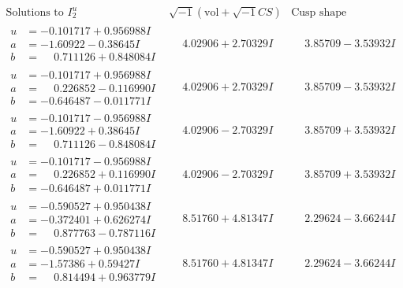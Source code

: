 \documentclass[1p]{elsarticle_modified}
\theoremstyle{definition}
\newcommand{\I}{\sqrt{-1}}
\begin{document}
$$\begin{array}{c|c|c}  
\text{Solutions to }I^u_{2}& \I (\text{vol} + \sqrt{-1}CS) & \text{Cusp shape}\\
 \hline 
\begin{aligned}
u &= -0.101717 + 0.956988 I \\
a &= -1.60922 - 0.38645 I \\
b &= \phantom{-}0.711126 + 0.848084 I\end{aligned}
 & \phantom{-}4.02906 + 2.70329 I & \phantom{-}3.85709 - 3.53932 I \\ \hline\begin{aligned}
u &= -0.101717 + 0.956988 I \\
a &= \phantom{-}0.226852 - 0.116990 I \\
b &= -0.646487 - 0.011771 I\end{aligned}
 & \phantom{-}4.02906 + 2.70329 I & \phantom{-}3.85709 - 3.53932 I \\ \hline\begin{aligned}
u &= -0.101717 - 0.956988 I \\
a &= -1.60922 + 0.38645 I \\
b &= \phantom{-}0.711126 - 0.848084 I\end{aligned}
 & \phantom{-}4.02906 - 2.70329 I & \phantom{-}3.85709 + 3.53932 I \\ \hline\begin{aligned}
u &= -0.101717 - 0.956988 I \\
a &= \phantom{-}0.226852 + 0.116990 I \\
b &= -0.646487 + 0.011771 I\end{aligned}
 & \phantom{-}4.02906 - 2.70329 I & \phantom{-}3.85709 + 3.53932 I \\ \hline\begin{aligned}
u &= -0.590527 + 0.950438 I \\
a &= -0.372401 + 0.626274 I \\
b &= \phantom{-}0.877763 - 0.787116 I\end{aligned}
 & \phantom{-}8.51760 + 4.81347 I & \phantom{-}2.29624 - 3.66244 I \\ \hline\begin{aligned}
u &= -0.590527 + 0.950438 I \\
a &= -1.57386 + 0.59427 I \\
b &= \phantom{-}0.814494 + 0.963779 I\end{aligned}
 & \phantom{-}8.51760 + 4.81347 I & \phantom{-}2.29624 - 3.66244 I \\ \hline\begin{aligned}

\end{aligned}
\end{array}$$
\end{document}
